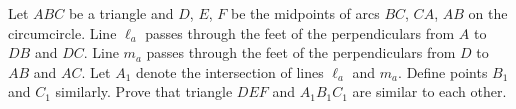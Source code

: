 Let $ABC$ be a triangle and $D$, $E$, $F$ be the midpoints of arcs $BC$, $CA$, $AB$ on the circumcircle.  Line $\ell_a$ passes through the feet of the perpendiculars from $A$ to $DB$ and $DC$.  Line $m_a$ passes through the feet of the perpendiculars from $D$ to $AB$ and $AC$.  Let $A_1$ denote the intersection of lines $\ell_a$ and $m_a$.  Define points $B_1$ and $C_1$ similarly.  Prove that triangle $DEF$ and $A_1B_1C_1$ are similar to each other.